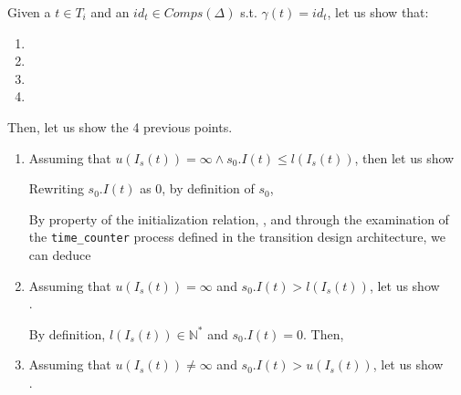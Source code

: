 \documentclass[dvipsnames,12pt]{article}
\begin{document}
\begin{niproof}
  Given a $t\in{}T_i$ and an $id_t\in{}Comps(\Delta)$
  s.t. $\gamma(t)=id_t$, let us show that:
  \begin{enumerate}
  \item {}
  \item {}
  \item {}
  \item {}
  \end{enumerate}

  \exP

  Then, let us show the 4 previous points.
  
  \begin{enumerate}
  \item Assuming that $u(I_s(t))=\infty\land{}s_0.I(t)\le{}l(I_s(t))$, then let us show\\
    
    Rewriting $s_0.I(t)$ as $0$, by definition of $s_0$,

    \noindent By property of the \hvhdl{} initialization relation,
    \InCsCompT, and through the examination of the
    \texttt{time\_counter} process defined in the transition design
    architecture, we can deduce
    
  \item Assuming that $u(I_s(t))=\infty$ and
    $s_0.I(t)>{}l(I_s(t))$, let us show\\
    .

    By definition, $l(I_s(t))\in\mathbb{N}^{*}$ and
    $s_0.I(t)=0$. Then, 
    
  \item Assuming that $u(I_s(t))\neq\infty$ and
    $s_0.I(t)>{}u(I_s(t))$, let us show\\
    .


\end{enumerate}
\end{niproof}
\end{document}
